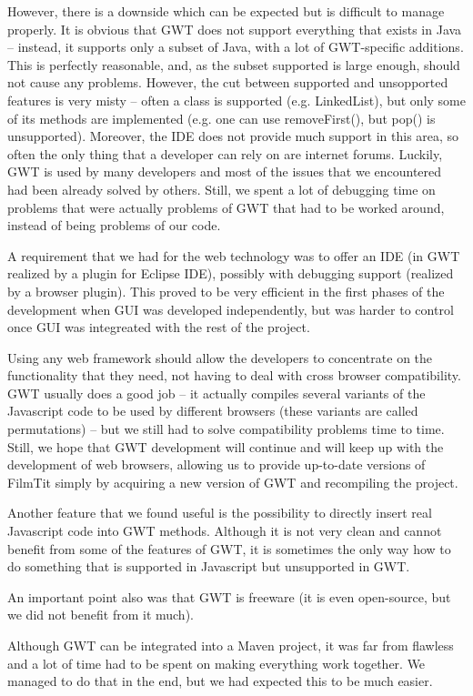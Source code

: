 However, there is a downside which can be expected but is difficult to manage properly. It is obvious that GWT does not support everything that exists in Java -- instead, it supports only a subset of Java, with a lot of GWT-specific additions. This is perfectly reasonable, and, as the subset supported is large enough, should not cause any problems. However, the cut between supported and unsopported features is very misty -- often a class is supported (e.g. LinkedList), but only some of its methods are implemented (e.g. one can use removeFirst(), but pop() is unsupported). Moreover, the IDE does not provide much support in this area, so often the only thing that a developer can rely on are internet forums. Luckily, GWT is used by many developers and most of the issues that we encountered had been already solved by others. Still, we spent a lot of debugging time on problems that were actually problems of GWT that had to be worked around, instead of being problems of our code.

A requirement that we had for the web technology was to offer an IDE (in GWT realized by a plugin for Eclipse IDE), possibly with debugging support (realized by a browser plugin). This proved to be very efficient in the first phases of the development when GUI was developed independently, but was harder to control once GUI was integreated with the rest of the project.

Using any web framework should allow the developers to concentrate on the functionality that they need, not having to deal with cross browser compatibility. GWT usually does a good job -- it actually compiles several variants of the Javascript code to be used by different browsers (these variants are called permutations) -- but we still had to solve compatibility problems time to time.
Still, we hope that GWT development will continue and will keep up with the development of web browsers, allowing us to provide up-to-date versions of FilmTit simply by acquiring a new version of GWT and recompiling the project.

Another feature that we found useful is the possibility to directly insert real Javascript code into GWT methods. Although it is not very clean and cannot benefit from some of the features of GWT, it is sometimes the only way how to do something that is supported in Javascript but unsupported in GWT.

An important point also was that GWT is freeware (it is even open-source, but we did not benefit from it much).

Although GWT can be integrated into a Maven project, it was far from flawless and a lot of time had to be spent on making everything work together. We managed to do that in the end, but we had expected this to be much easier.

